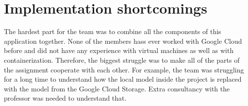 \section{Implementation shortcomings}



The hardest part for the team was to combine all the components of this application together. None of the members hass ever worked with Google Cloud before and did not have any experience with virtual machines as well as with containerization. Therefore, the biggest struggle was to make all of the parts of the assignment cooperate with each other. For example, the team was struggling for a long time to understand how the local model inside the project is replaced with the model from the Google Cloud Storage. Extra consultancy with the professor was needed to understand that.


